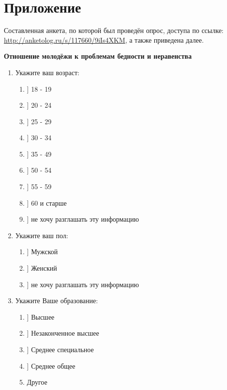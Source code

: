 \section*{Приложение}

\newcommand{\dline}{\makebox[0.5cm]{\hrulefill}}
\newcommand{\hugeline}{\makebox[10cm]{\hrulefill}}

Составленная анкета, по которой был проведён опрос, доступа по ссылке:
\url{http://anketolog.ru/s/117660/9iIs4XKM}, а также приведена далее. 

\begin{center}
    \textbf{Отношение молодёжи к проблемам бедности и неравенства}
\end{center}
\begin{enumerate}
    \item Укажите ваш возраст:
    \begin{enumerate}
        \item[\dline] 18 - 19
        \item[\dline] 20 - 24
        \item[\dline] 25 - 29
        \item[\dline] 30 - 34
        \item[\dline] 35 - 49
        \item[\dline] 50 - 54
        \item[\dline] 55 - 59
        \item[\dline] 60 и старше
        \item[\dline] не хочу разглашать эту информацию
    \end{enumerate}

    \item Укажите ваш пол:
    \begin{enumerate}
        \item[\dline] Мужской
        \item[\dline] Женский
        \item[\dline] не хочу разглашать эту информацию
    \end{enumerate}

    \item Укажите Ваше образование:
    \begin{enumerate}
        \item[\dline] Высшее
        \item[\dline] Незаконченное высшее
        \item[\dline] Среднее специальное
        \item[\dline] Среднее общее
        \item[] Другое \hugeline 
    \end{enumerate}


\end{enumerate}
